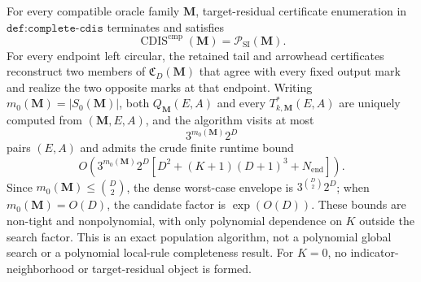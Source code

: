 For every compatible oracle family \(\mathbf M\), target-residual certificate enumeration in \(\texttt{def:complete-cdis}\) terminates and satisfies
\[
\operatorname{CDIS}^{\mathrm{cmp}}(\mathbf M)=\mathcal P_{\mathrm{SI}}(\mathbf M).
\]
For every endpoint left circular, the retained tail and arrowhead certificates reconstruct two members of \(\mathfrak C_D(\mathbf M)\) that agree with every fixed output mark and realize the two opposite marks at that endpoint.  Writing \(m_0(\mathbf M)=|S_0(\mathbf M)|\), both \(Q_{\mathbf M}(E,A)\) and every \(T^*_{k,\mathbf M}(E,A)\) are uniquely computed from \((\mathbf M,E,A)\), and the algorithm visits at most
\[
3^{m_0(\mathbf M)}2^D
\]
pairs \((E,A)\) and admits the crude finite runtime bound
\[
O\!\left(3^{m_0(\mathbf M)}2^D
\left[D^2+(K+1)(D+1)^3+N_{\mathrm{end}}\right]\right).
\]
Since \(m_0(\mathbf M)\le\binom D2\), the dense worst-case envelope is \(3^{\binom D2}2^D\); when \(m_0(\mathbf M)=O(D)\), the candidate factor is \(\exp(O(D))\).  These bounds are non-tight and nonpolynomial, with only polynomial dependence on \(K\) outside the search factor.  This is an exact population algorithm, not a polynomial global search or a polynomial local-rule completeness result.  For \(K=0\), no indicator-neighborhood or target-residual object is formed.